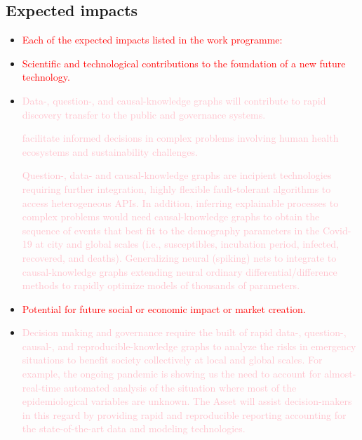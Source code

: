 \documentclass[12pt, a4paper]{article} %
\begin{document}
\subsection{Expected impacts}

\begin{itemize}
\item \textcolor{red}{Each of the expected impacts listed in the work
    programme:}
\item \textcolor{red}{Scientific and technological contributions to
    the foundation of a new future technology.}
\item \textcolor{pink}{Data-, question-, and causal-knowledge graphs
    will contribute to rapid discovery transfer to the public and
    governance systems.


    facilitate informed decisions in complex problems
    involving human health ecosystems and sustainability
    challenges.


    Question-, data- and causal-knowledge graphs are incipient
    technologies requiring further integration, highly flexible fault-tolerant
    algorithms to access heterogeneous APIs. In addition, inferring
    explainable processes to complex problems would need
    causal-knowledge graphs to obtain the sequence of events that best
    fit to the demography parameters in the Covid-19 at city and
    global scales (i.e., susceptibles, incubation period, infected,
    recovered, and deaths). Generalizing neural (spiking) nets to
    integrate to causal-knowledge graphs extending neural ordinary
    differential/difference methods to rapidly optimize models of
    thousands of parameters.}
\item \textcolor{red}{Potential for future social or economic impact
    or market creation.}
\item \textcolor{pink}{Decision making and governance require the
    built of rapid data-, question-, causal-, and
    reproducible-knowledge graphs to analyze the risks in emergency
    situations to benefit society collectively at local and global
    scales.  For example, the ongoing pandemic is showing us the
    need to account for almost-real-time automated analysis of the
    situation where most of the epidemiological variables are
    unknown. The Asset will assist decision-makers in this regard by
    providing rapid and reproducible reporting accounting for the
    state-of-the-art data and modeling technologies.


}
\end{itemize}
\end{document}
